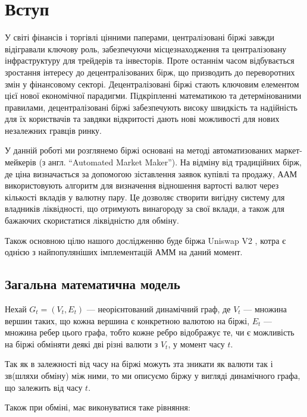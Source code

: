 \documentclass[a4paper, 12pt]{article}
\newcommand{\tqs}{\textquotesingle}
\begin{document}
\newpage

\section{Вступ}\label{sec:intro}

У світі фінансів і торгівлі цінними паперами, централізовані біржі завжди
відігравали ключову роль, забезпечуючи місцезнаходження та централізовану
інфраструктуру для трейдерів та інвесторів. Проте останнім часом відбувається
зростання інтересу до децентралізованих бірж, що призводить до переворотних змін
у фінансовому секторі. Децентралізовані біржі стають ключовим елементом цієї
нової економічної парадигми. Підкріпленні математикою та детермінованими
правилами, децентралізовані біржі забезпечують високу швидкість та надійність
для їх користвачів та завдяки відкритості дають нові можливості для нових
незалежних гравців ринку.

У данній роботі ми розглянемо біржі основані на методі автоматизованих
маркет-мейкерів (з англ. ``Automated Market Maker''). На відміну від традиційних
бірж, де ціна визначається за допомогою зіставлення заявок купівлі та продажу,
ААМ використовують алгоритм для визначення відношення вартості валют через
кількості вкладів у валютну пару. Це дозволяє створити вигідну систему для
владників ліквідності, що отримують винагороду за свої вклади, а також для
бажаючих скористатися ліквідністю для обміну.

Також основною цілю нашого дослідженню буде біржа Uniswap V2 \cite{adams2021uniswap},
котра є однією з найпопуляніших імплементацій АММ на даний момент.

\subsection{Загальна математична модель}\label{sec:math-model}

Нехай \(G_{t} = (V_{t}, E_{t})\) --- неорієнтований динамічний граф, де \(V_{t}\) ---
множина вершин таких, що кожна вершина є конкретною валютою на біржі,
\(E_{t}\) --- множина ребер цього графа, тобто кожне ребро відображує те, чи є
можливість на біржі обміняти деякі дві різні валюти з \(V_{t}\), у момент часу
\(t\).

Так як в залежності від часу на біржі можуть з та зникати як валюти так
і зв (шляхи обміну) між ними, то ми описуємо біржу у вигляді динамічного
графа, що залежить від часу \(t\).

Також при обміні, має виконуватися таке рівняння:
\end{document}
